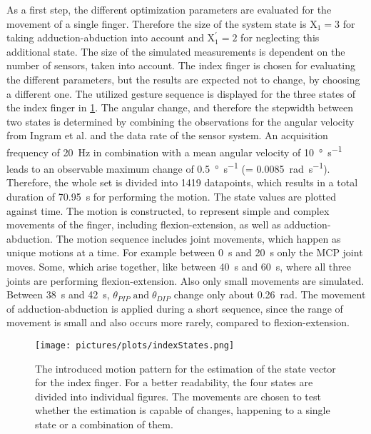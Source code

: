 As a first step, the different optimization parameters are evaluated for the movement of a single finger. Therefore the size of the system state is $ \mathrm{X}_{1} = 3 $ for taking adduction-abduction into account and $ \mathrm{X}^\prime_{1} = 2 $ for neglecting this additional state. The size of the simulated measurements is dependent on the number of sensors, taken into account. The index finger is chosen for evaluating the different parameters, but the results are expected not to change, by choosing a different one. The utilized gesture sequence is displayed for the three states of the index finger in \ref{fig:indexStates}. The angular change, and therefore the stepwidth between two states is determined by combining the observations for the angular velocity from Ingram et al. \cite{ingram2008statistics} and the data rate of the sensor system. An acquisition frequency of \SI{20}{\Hz} in combination with a mean angular velocity of \SI[per-mode=symbol]{10}{\degree \per \second} leads to an observable maximum change of \SI[per-mode=symbol]{0.5}{\degree \per \second} (= \SI[per-mode=symbol]{0.0085}{\radian \per \second}). Therefore, the whole set is divided into 1419 datapoints, which results in a total duration of \SI{70.95}{\second} for performing the motion. The state values are plotted against time. The motion is constructed, to represent simple and complex movements of the finger, including flexion-extension, as well as adduction-abduction. The motion sequence includes joint movements, which happen as unique motions at a time. For example between \SI{0}{\second} and \SI{20}{\second} only the \ac{MCP} joint moves. Some, which arise together, like between \SI{40}{\second} and \SI{60}{\second}, where all three joints are performing flexion-extension. Also only small movements are simulated. Between \SI{38}{\second} and \SI{42}{\second}, $ \theta_{PIP} \; \text{and} \; \theta_{DIP} $ change only about \SI{0.26}{\radian}. The movement of adduction-abduction is applied during a short sequence, since the range of movement is small and also occurs more rarely, compared to flexion-extension. 
\begin{figure}
\centering
\texttt{[image: pictures/plots/indexStates.png]}
\caption[Introduced movement pattern for index finger estimation]
{The introduced motion pattern for the estimation of the state vector for the index finger. For a better readability, the four states are divided into individual figures. The movements are chosen to test whether the estimation is capable of changes, happening to a single state or a combination of them.}
\label{fig:indexStates}
\end{figure}
